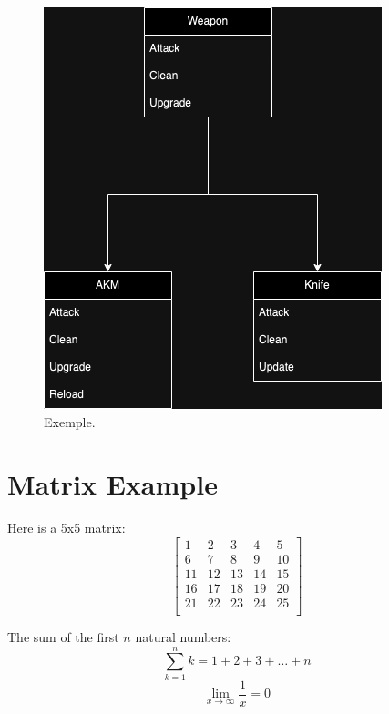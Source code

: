 \documentclass{article}
\begin{document}
\begin{figure}[h]
\begin{minipage}[t]{0.48\linewidth}
            \includegraphics[width=\textwidth]{second}
        \end{minipage}
        \caption{Exemple.}
        \label{fig:my_image}
    \end{figure}

    \section*{Matrix Example}
    Here is a 5x5 matrix:
    \[
        \begin{bmatrix}
            1 & 2 & 3 & 4 & 5 \\
            6 & 7 & 8 & 9 & 10 \\
            11 & 12 & 13 & 14 & 15 \\
            16 & 17 & 18 & 19 & 20 \\
            21 & 22 & 23 & 24 & 25 \\
            \end{bmatrix}
    \]

    The sum of the first $n$ natural numbers:
    \[
        \sum_{k=1}^{n} k = 1 + 2 + 3 + \ldots + n
    \]
    \[
        \lim_{{x \to \infty}} \frac{1}{x} = 0
    \]
\end{document}
